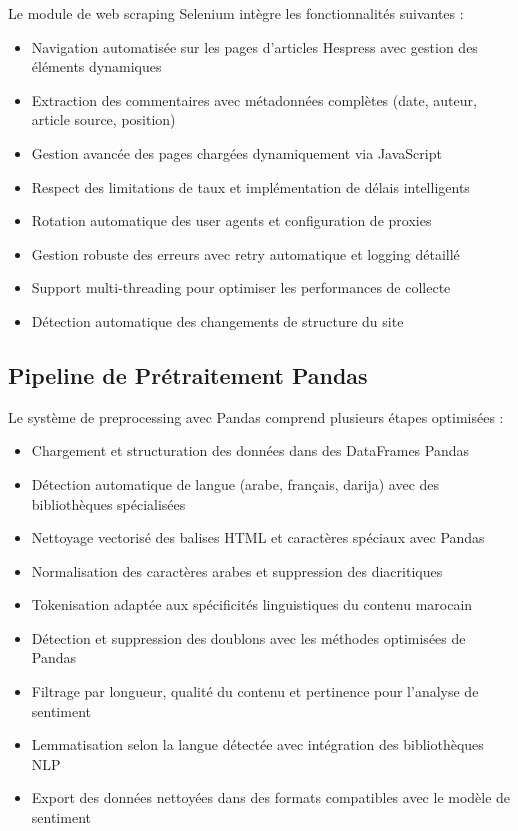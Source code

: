 Le module de web scraping Selenium intègre les fonctionnalités suivantes :
\begin{itemize}
    \item Navigation automatisée sur les pages d'articles Hespress avec gestion des éléments dynamiques
    \item Extraction des commentaires avec métadonnées complètes (date, auteur, article source, position)
    \item Gestion avancée des pages chargées dynamiquement via JavaScript
    \item Respect des limitations de taux et implémentation de délais intelligents
    \item Rotation automatique des user agents et configuration de proxies
    \item Gestion robuste des erreurs avec retry automatique et logging détaillé
    \item Support multi-threading pour optimiser les performances de collecte
    \item Détection automatique des changements de structure du site
\end{itemize}

\subsection{Pipeline de Prétraitement Pandas}

Le système de preprocessing avec Pandas comprend plusieurs étapes optimisées :
\begin{itemize}
    \item Chargement et structuration des données dans des DataFrames Pandas
    \item Détection automatique de langue (arabe, français, darija) avec des bibliothèques spécialisées
    \item Nettoyage vectorisé des balises HTML et caractères spéciaux avec Pandas
    \item Normalisation des caractères arabes et suppression des diacritiques
    \item Tokenisation adaptée aux spécificités linguistiques du contenu marocain
    \item Détection et suppression des doublons avec les méthodes optimisées de Pandas
    \item Filtrage par longueur, qualité du contenu et pertinence pour l'analyse de sentiment
    \item Lemmatisation selon la langue détectée avec intégration des bibliothèques NLP
    \item Export des données nettoyées dans des formats compatibles avec le modèle de sentiment
\end{itemize}

